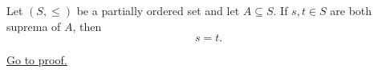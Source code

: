 \begin{proposition}
\label{prop:uniqueness-of-the-supremum}
Let $(S,\leq)$ be a partially ordered set and let $A\subseteq S$. If
$s,t\in S$ are both suprema of $A$, then
\[
  s=t.
\]

\hyperref[prf:uniqueness-of-the-supremum]{Go to proof.}
\end{proposition}